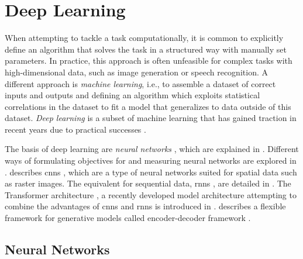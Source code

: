 \section{Deep Learning}
\label{sec:bg.dl}

When attempting to tackle a task computationally, it is common to explicitly define an algorithm that solves the task in a structured way with manually set parameters. In practice, this approach is often unfeasible for complex tasks with high-dimensional data, such as image generation or speech recognition. A different approach is \emph{machine learning}, i.e., to assemble a dataset of correct inputs and outputs and defining an algorithm which exploits statistical correlations in the dataset to fit a model that generalizes to data outside of this dataset. \emph{Deep learning} is a subset of machine learning that has gained traction in recent years due to practical successes \citep{DBLP:conf/cvpr/CiresanMS12,DBLP:conf/nips/KrizhevskySH12, DBLP:journals/nature/SilverHMGSDSAPL16,DBLP:conf/naacl/DevlinCLT19,DBLP:conf/nips/BrownMRSKDNSSAA20,DBLP:conf/cvpr/RombachBLEO22,DBLP:journals/corr/abs-2203-02155}.

The basis of deep learning are \emph{neural networks} \citep{Rosenblatt58theperceptron}, which are explained in . Different ways of formulating objectives for and measuring neural networks are explored in .  describes \glspl{cnn} \citep{DBLP:journals/pr/FukushimaM82,10.1162/neco.1989.1.4.541}, which are a type of neural networks suited for spatial data such as raster images. The equivalent for sequential data, \glspl{rnn} \citep{Rumelhart1986}, are detailed in . The Transformer architecture \citep{DBLP:conf/nips/VaswaniSPUJGKP17,schmidhuber1992learning}, a recently developed model architecture attempting to combine the advantages of \glspl{cnn} and \glspl{rnn} is introduced in .  describes a flexible framework for generative models called encoder-decoder framework \citep{DBLP:conf/nips/SutskeverVL14,FITPT283}.


\subsection{Neural Networks}
\label{subsec:bg.nn}

